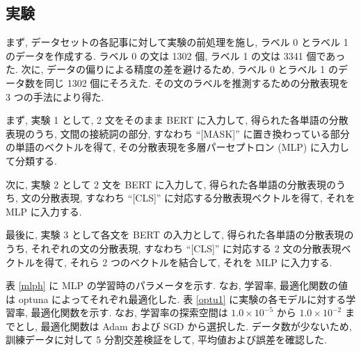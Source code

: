 \documentclass[twocolumn]{jarticle}     %
\begin{document}
\subsection{実験}
まず, データセットの各記事に対して実験の前処理を施し, ラベル 0 とラベル 1 のデータを作成する.
ラベル 0 の文は 1302 個, ラベル 1 の文は 3341 個であった.
次に, データの偏りによる精度の差を避けるため, ラベル 0 とラベル 1 のデータ数を同じ 1302 個にそろえた.
その文のラベルを推測するための分散表現を 3 つの手法により得た. \par
まず, 実験 1 として, 2 文をそのまま BERT に入力して, 得られた各単語の分散表現のうち,
文間の接続詞の部分, すなわち ``[MASK]'' に置き換わっている部分の単語のベクトルを得て, その分散表現を多層パーセプトロン (MLP) に入力して分類する. \par
次に, 実験 2 として 2 文を BERT に入力して, 得られた各単語の分散表現のうち,
文の分散表現, すなわち ``[CLS]'' に対応する分散表現ベクトルを得て, それを MLP に入力する. \par
最後に, 実験 3 として各文を BERT の入力として, 得られた各単語の分散表現のうち,
それぞれの文の分散表現, すなわち ``[CLS]'' に対応する 2 文の分散表現ベクトルを得て,
それら 2 つのベクトルを結合して, それを MLP に入力する. \par
表 \ref{mlph} に MLP の学習時のパラメータを示す.
なお,  学習率, 最適化関数の値は optuna によってそれぞれ最適化した.
表 \ref{optu1} に実験の各モデルに対する学習率, 最適化関数を示す.
なお, 学習率の探索空間は $1.0 \times 10^{-5}$ から $1.0 \times 10^{-2}$ までとし,
最適化関数は Adam および SGD から選択した.
データ数が少ないため, 訓練データに対して 5 分割交差検証をして, 平均値および誤差を確認した.
\end{document}
